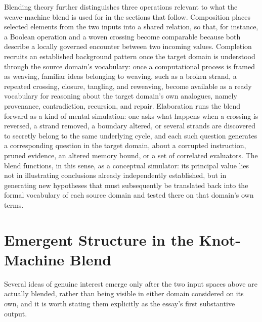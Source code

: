 \documentclass[11pt,openany]{book}
\begin{document}
Blending theory further distinguishes three operations relevant to what the weave-machine blend is used for in the sections that follow. Composition places selected elements from the two inputs into a shared relation, so that, for instance, a Boolean operation and a woven crossing become comparable because both describe a locally governed encounter between two incoming values. Completion recruits an established background pattern once the target domain is understood through the source domain's vocabulary: once a computational process is framed as weaving, familiar ideas belonging to weaving, such as a broken strand, a repeated crossing, closure, tangling, and reweaving, become available as a ready vocabulary for reasoning about the target domain's own analogues, namely provenance, contradiction, recursion, and repair. Elaboration runs the blend forward as a kind of mental simulation: one asks what happens when a crossing is reversed, a strand removed, a boundary altered, or several strands are discovered to secretly belong to the same underlying cycle, and each such question generates a corresponding question in the target domain, about a corrupted instruction, pruned evidence, an altered memory bound, or a set of correlated evaluators. The blend functions, in this sense, as a conceptual simulator: its principal value lies not in illustrating conclusions already independently established, but in generating new hypotheses that must subsequently be translated back into the formal vocabulary of each source domain and tested there on that domain's own terms.

\section{Emergent Structure in the Knot-Machine Blend}

Several ideas of genuine interest emerge only after the two input spaces above are actually blended, rather than being visible in either domain considered on its own, and it is worth stating them explicitly as the essay's first substantive output.
\end{document}
